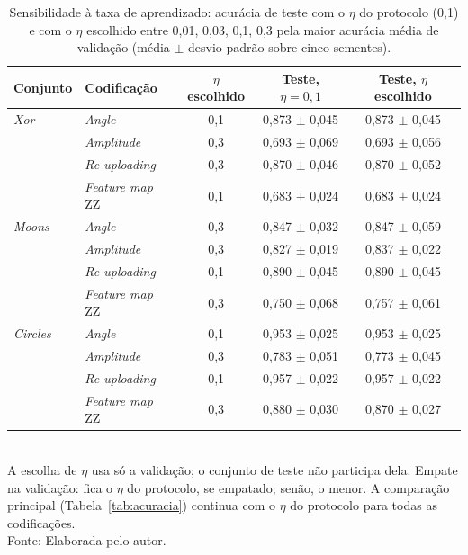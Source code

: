 \begin{table}[htb]
\centering
\caption[Sensibilidade à taxa de aprendizado]{Sensibilidade à taxa de aprendizado: acurácia de teste com o $\eta$ do protocolo (0,1) e com o $\eta$ escolhido entre 0,01, 0,03, 0,1, 0,3 pela maior acurácia média de validação (média $\pm$ desvio padrão sobre cinco sementes).}
\label{tab:sensibilidade}
\begin{tabular}{llccc}
\toprule
Conjunto & Codificação & $\eta$ escolhido & Teste, $\eta = 0{,}1$ & Teste, $\eta$ escolhido \\
\midrule
\textit{Xor} & \textit{Angle} & 0,1 & 0,873 $\pm$ 0,045 & 0,873 $\pm$ 0,045 \\
 & \textit{Amplitude} & 0,3 & 0,693 $\pm$ 0,069 & 0,693 $\pm$ 0,056 \\
 & \textit{Re-uploading} & 0,3 & 0,870 $\pm$ 0,046 & 0,870 $\pm$ 0,052 \\
 & \textit{Feature map} ZZ & 0,1 & 0,683 $\pm$ 0,024 & 0,683 $\pm$ 0,024 \\
\midrule
\textit{Moons} & \textit{Angle} & 0,3 & 0,847 $\pm$ 0,032 & 0,847 $\pm$ 0,059 \\
 & \textit{Amplitude} & 0,3 & 0,827 $\pm$ 0,019 & 0,837 $\pm$ 0,022 \\
 & \textit{Re-uploading} & 0,1 & 0,890 $\pm$ 0,045 & 0,890 $\pm$ 0,045 \\
 & \textit{Feature map} ZZ & 0,3 & 0,750 $\pm$ 0,068 & 0,757 $\pm$ 0,061 \\
\midrule
\textit{Circles} & \textit{Angle} & 0,1 & 0,953 $\pm$ 0,025 & 0,953 $\pm$ 0,025 \\
 & \textit{Amplitude} & 0,3 & 0,783 $\pm$ 0,051 & 0,773 $\pm$ 0,045 \\
 & \textit{Re-uploading} & 0,1 & 0,957 $\pm$ 0,022 & 0,957 $\pm$ 0,022 \\
 & \textit{Feature map} ZZ & 0,3 & 0,880 $\pm$ 0,030 & 0,870 $\pm$ 0,027 \\
\bottomrule
\end{tabular}
\\[2pt]
{\footnotesize A escolha de $\eta$ usa só a validação; o conjunto de teste não participa dela. Empate na validação: fica o $\eta$ do protocolo, se empatado; senão, o menor. A comparação principal (Tabela~\ref{tab:acuracia}) continua com o $\eta$ do protocolo para todas as codificações.}
\\[2pt]
{\footnotesize Fonte: Elaborada pelo autor.}
\end{table}
